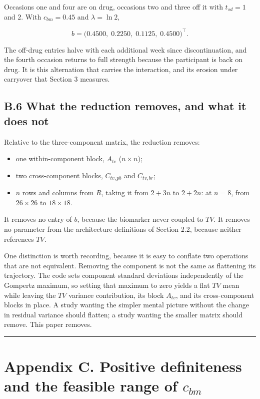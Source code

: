 \documentclass[
  11pt,
]{article}
\begin{document}
Occasions one and four are on drug, occasions two and three off it
with \(t_{sd} = 1\) and \(2\). With \(c_{bm} = 0.45\) and \(\lambda = \ln 2\),

\[
b = \bigl(0.4500,\; 0.2250,\; 0.1125,\; 0.4500\bigr)^{\!\top}.
\]

The off-drug entries halve with each additional week since
discontinuation, and the fourth occasion returns to full strength
because the participant is back on drug. It is this alternation that
carries the interaction, and its erosion under carryover that
Section 3 measures.

\subsection{B.6 What the reduction removes, and what it does not}

Relative to the three-component matrix, the reduction removes:

\begin{itemize}
\item one within-component block, $A_{tv}$ ($n \times n$);
\item two cross-component blocks, $C_{tv,pb}$ and $C_{tv,br}$;
\item $n$ rows and columns from $R$, taking it from $2+3n$ to
  $2+2n$: at $n = 8$, from $26 \times 26$ to $18 \times 18$.
\end{itemize}

It removes no entry of \(b\), because the biomarker never coupled to
\(TV\). It removes no parameter from the architecture definitions of
Section 2.2, because neither references \(TV\).

One distinction is worth recording, because it is easy to conflate
two operations that are not equivalent. Removing the component is not
the same as flattening its trajectory. The code sets component
standard deviations independently of the Gompertz maximum, so setting
that maximum to zero yields a flat \(TV\) mean while leaving the \(TV\)
variance contribution, its block \(A_{tv}\), and its cross-component
blocks in place. A study wanting the simpler mental picture without
the change in residual variance should flatten; a study wanting the
smaller matrix should remove. This paper removes.

\bigskip\noindent

\rule{\textwidth}{0.4pt}\bigskip

\section{Appendix C. Positive definiteness and the feasible range of
$c_{bm}$}
\end{document}
